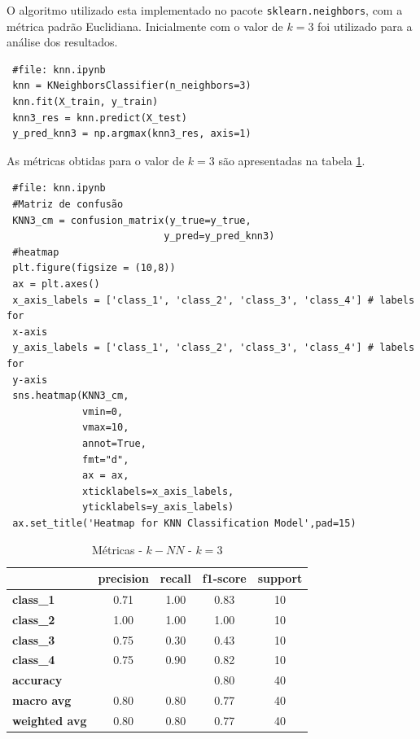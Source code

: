 \documentclass[
	article,			%
	11pt,				%
	oneside,			%
	a4paper,			%
	english,			%
	brazil,				%
	sumario=tradicional
	]{abntex2}
\begin{document}
O algoritmo utilizado esta implementado no pacote \verb|sklearn.neighbors|, com a métrica padrão Euclidiana. Inicialmente com o valor de $k=3$ foi utilizado para a análise dos resultados.

\begin{verbatim}
 #file: knn.ipynb
 knn = KNeighborsClassifier(n_neighbors=3)
 knn.fit(X_train, y_train)
 knn3_res = knn.predict(X_test)
 y_pred_knn3 = np.argmax(knn3_res, axis=1)
\end{verbatim}

As métricas obtidas para o valor de $k=3$ são apresentadas na tabela \ref{tab:knn_01}.

\begin{verbatim}
 #file: knn.ipynb
 #Matriz de confusão
 KNN3_cm = confusion_matrix(y_true=y_true, 
                           y_pred=y_pred_knn3)
 #heatmap                           
 plt.figure(figsize = (10,8))
 ax = plt.axes()
 x_axis_labels = ['class_1', 'class_2', 'class_3', 'class_4'] # labels for
 x-axis
 y_axis_labels = ['class_1', 'class_2', 'class_3', 'class_4'] # labels for 
 y-axis
 sns.heatmap(KNN3_cm,
             vmin=0,
             vmax=10,
             annot=True,
             fmt="d",
             ax = ax,
             xticklabels=x_axis_labels, 
             yticklabels=y_axis_labels)
 ax.set_title('Heatmap for KNN Classification Model',pad=15)
\end{verbatim}

\begin{table}[H]
\centering
\begin{tabular}{l|c|c|c|c|}
\cline{2-5}
                                            & \textbf{precision} & \textbf{recall} & \textbf{f1-score} & \textbf{support} \\ \hline
\multicolumn{1}{|l|}{\textbf{class\_1}}     & 0.71               & 1.00            & 0.83              & 10               \\ \hline
\multicolumn{1}{|l|}{\textbf{class\_2}}     & 1.00               & 1.00            & 1.00              & 10               \\ \hline
\multicolumn{1}{|l|}{\textbf{class\_3}}     & 0.75               & 0.30            & 0.43              & 10               \\ \hline
\multicolumn{1}{|l|}{\textbf{class\_4}}     & 0.75               & 0.90            & 0.82              & 10               \\ \hline
\multicolumn{1}{|l|}{\textbf{accuracy}}     &                    &                 & 0.80              & 40               \\ \hline
\multicolumn{1}{|l|}{\textbf{macro avg}}    & 0.80               & 0.80            & 0.77              & 40               \\ \hline
\multicolumn{1}{|l|}{\textbf{weighted avg}} & 0.80               & 0.80            & 0.77              & 40               \\ \hline
\end{tabular}
\caption{Métricas - $k-NN$ - $k=3$}
\label{tab:knn_01}
\end{table}
\end{document}

